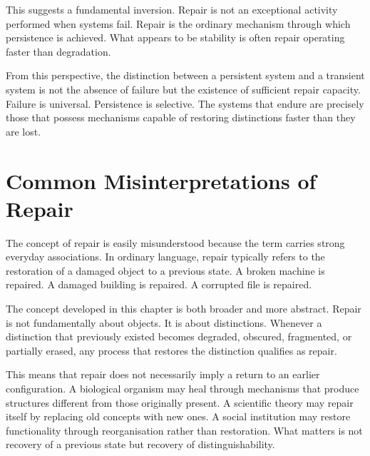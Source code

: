 \documentclass[12pt,twoside,openright]{book}
\begin{document}
This suggests a fundamental inversion. Repair is not an
exceptional activity performed when systems fail. Repair is
the ordinary mechanism through which persistence is
achieved. What appears to be stability is often repair
operating faster than degradation.

From this perspective, the distinction between a persistent
system and a transient system is not the absence of failure
but the existence of sufficient repair capacity. Failure is
universal. Persistence is selective. The systems that
endure are precisely those that possess mechanisms capable
of restoring distinctions faster than they are lost.

\section{Common Misinterpretations of Repair}
\label{sec:ch7-misinterpretations}

The concept of repair is easily misunderstood because the
term carries strong everyday associations. In ordinary
language, repair typically refers to the restoration of a
damaged object to a previous state. A broken machine is
repaired. A damaged building is repaired. A corrupted file
is repaired.

The concept developed in this chapter is both broader and
more abstract. Repair is not fundamentally about objects.
It is about distinctions. Whenever a distinction that
previously existed becomes degraded, obscured, fragmented,
or partially erased, any process that restores the
distinction qualifies as repair.

This means that repair does not necessarily imply a return
to an earlier configuration. A biological organism may heal
through mechanisms that produce structures different from
those originally present. A scientific theory may repair
itself by replacing old concepts with new ones. A social
institution may restore functionality through
reorganisation rather than restoration. What matters is not
recovery of a previous state but recovery of
distinguishability.
\end{document}
